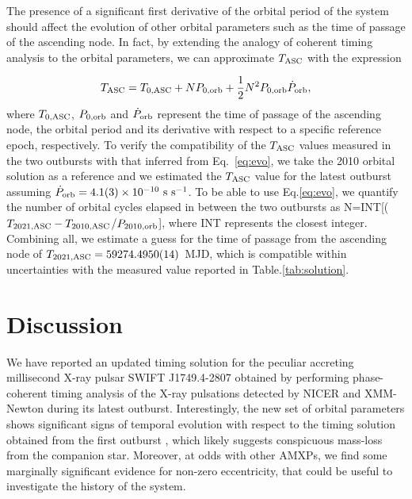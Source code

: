 \documentclass[fleqn,usenatbib]{mnras}
\newcommand{\swiftj}{SWIFT J1749.4-2807}
\newcommand{\nicer}{NICER}
\newcommand{\xmm}{XMM-Newton}
\begin{document}
The presence of a significant first derivative of the orbital period of the system should affect the evolution of other orbital parameters such as the time of passage of the ascending node. In fact, by extending the analogy of coherent timing analysis to the orbital parameters, we can approximate $T_{\rm ASC}$ with the expression

\begin{equation}
\label{eq:evo}
T_{\rm ASC}=T_{0,{\rm ASC}}+N P_{0,{\rm orb}}+\frac{1}{2}N^2P_{0,{\rm orb}}\dot{P}_{\rm orb},
\end{equation}
where $T_{0,{\rm ASC}}$, $P_{0,{\rm orb}}$ and $\dot{P}_{\rm orb}$ represent the time of passage of	the ascending node, the orbital period and its derivative with respect to a specific reference epoch, respectively. 
To verify the compatibility of the $T_{\rm ASC}$ values measured in the two outbursts with that inferred from Eq.~\ref{eq:evo}, we take the 2010 orbital solution as a reference and we estimated the $T_{\rm ASC}$ value for the latest outburst assuming $\dot{P}_{\rm orb}=4.1(3)\times 10^{-10}~\text{s}~\text{s}^{-1}$. To be able to use Eq.\ref{eq:evo}, we quantify the number of orbital cycles elapsed in between the two outbursts as N=INT[($T_{2021,{\rm ASC}}-T_{2010,{\rm ASC}}$/$P_{2010,{\rm orb}}$], where INT represents the closest integer. Combining all, we estimate a guess for the time of passage from the ascending node of $T_{2021,{\rm ASC}}=59274.4950(14)$~MJD, which is compatible within uncertainties with the measured value reported in Table.\ref{tab:solution}.



\section{Discussion}


We have reported an updated timing solution for the peculiar accreting millisecond X-ray pulsar \swiftj{} obtained by performing phase-coherent timing analysis of the X-ray pulsations detected by \nicer{} and \xmm{} during its latest outburst. Interestingly, the new set of orbital parameters shows significant signs of temporal evolution with respect to the timing solution obtained from the first outburst \citep[see also][]{Markwardt:2010tl,Altamirano:2011uq}, which likely suggests conspicuous mass-loss from the companion star. Moreover, at odds with other AMXPs, we find some  marginally significant evidence for non-zero eccentricity, that could be useful to investigate the history of the system.
\end{document}
